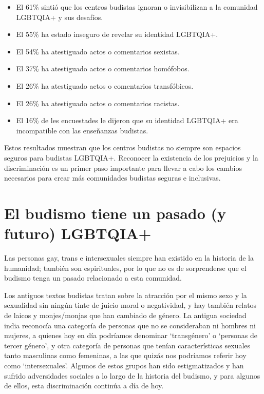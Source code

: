\documentclass[12pt,openany]{book}
\begin{document}
\begin{itemize}
\setlength\itemsep{-0.3em}
  \item El 61\% sintió que los centros budistas ignoran o invisibilizan a la comunidad LGBTQIA+ y sus desafíos.
  \item El 55\% ha estado inseguro de revelar su identidad LGBTQIA+.
  \item El 54\% ha atestiguado actos o comentarios sexistas.
  \item El 37\% ha atestiguado actos o comentarios homófobos.
  \item El 26\% ha atestiguado actos o comentarios transfóbicos.
  \item El 26\% ha atestiguado actos o comentarios racistas.
  \item El 16\% de les encuestades le dijeron que su identidad LGBTQIA+ era incompatible con las enseñanzas budistas.
\end{itemize}

Estos resultados muestran que los centros budistas no siempre son espacios seguros para budistas LGBTQIA+. Reconocer la existencia de los prejuicios y la discriminación es un primer paso importante para llevar a cabo los cambios necesarios para crear más comunidades budistas seguras e inclusivas.

\section*{El budismo tiene un pasado (y futuro) LGBTQIA+}

Las personas gay, trans e intersexuales siempre han existido en la historia de la humanidad; también son espirituales, por lo que no es de sorprenderse que el budismo tenga un pasado relacionado a esta comunidad.

Los antiguos textos budistas tratan sobre la atracción por el mismo sexo y la sexualidad sin ningún tinte de juicio moral o negatividad, y hay también relatos de laicos y monjes/monjas que han cambiado de género. La antigua sociedad india reconocía una categoría de personas que no se consideraban ni hombres ni mujeres, a quienes hoy en día podríamos denominar `transgénero' o `personas de tercer género', y otra categoría de personas que tenían características sexuales tanto masculinas como femeninas, a las que quizás nos podríamos referir hoy como `intersexuales'. Algunos de estos grupos han sido estigmatizados y han sufrido adversidades sociales a lo largo de la historia del budismo, y para algunos de ellos, esta discriminación continúa a día de hoy.
\end{document}
